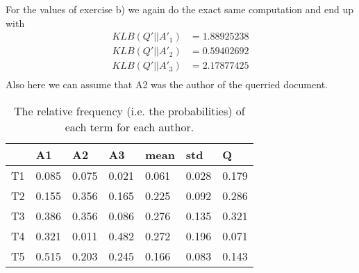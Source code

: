 \documentclass[11pt]{article}
\begin{document}
For the values of exercise b) we again do the exact same computation and end up with
\begin{align*}
	KLB(Q'|| A'_1) &= 1.88925238 \\
	KLB(Q'|| A'_2) &= 0.59402692 \\
	KLB(Q'|| A'_3) &= 2.17877425 \\
\end{align*}
Also here we can assume that A2 was the author of the querried document.
\begin{table}[h]
\center
\begin{tabular}{|l|l|l|l|l|l||l|}
\hline
	 & A1 & A2 & A3 & mean & std & Q\\
\hline
	T1 & 0.085 & 0.075 & 0.021 & 0.061 & 0.028 & 0.179\\
\hline
	T2 & 0.155 & 0.356 & 0.165 & 0.225 & 0.092 & 0.286 \\
\hline
	T3 & 0.386 & 0.356 & 0.086 & 0.276 & 0.135 & 0.321 \\
\hline
	T4 & 0.321 & 0.011 & 0.482 & 0.272 & 0.196 & 0.071 \\
\hline
	T5 & 0.515 & 0.203 & 0.245 & 0.166 & 0.083 & 0.143 \\
\hline
\end{tabular}
\caption{The relative frequency (i.e. the probabilities) of each term
for each author.}
\label{table:rel_freq}
\end{table}
\end{document}
